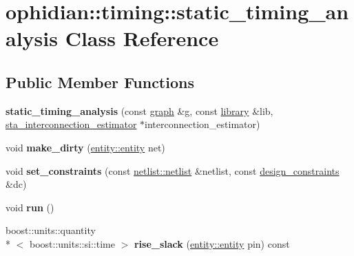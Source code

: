 \hypertarget{classophidian_1_1timing_1_1static__timing__analysis}{\section{ophidian\-:\-:timing\-:\-:static\-\_\-timing\-\_\-analysis Class Reference}
\label{classophidian_1_1timing_1_1static__timing__analysis}
}
\subsection*{Public Member Functions}
\begin{DoxyCompactItemize}
\item 
\hypertarget{classophidian_1_1timing_1_1static__timing__analysis_a78b20f32e89fdaa5c07c368962891ecc}{{\bfseries static\-\_\-timing\-\_\-analysis} (const \hyperlink{classophidian_1_1timing_1_1graph}{graph} \&g, const \hyperlink{classophidian_1_1timing_1_1library}{library} \&lib, \hyperlink{classophidian_1_1timing_1_1sta__interconnection__estimator}{sta\-\_\-interconnection\-\_\-estimator} $\ast$interconnection\-\_\-estimator)}\label{classophidian_1_1timing_1_1static__timing__analysis_a78b20f32e89fdaa5c07c368962891ecc}

\item 
\hypertarget{classophidian_1_1timing_1_1static__timing__analysis_a79be31aec074017707a897401501ce16}{void {\bfseries make\-\_\-dirty} (\hyperlink{classophidian_1_1entity_1_1entity}{entity\-::entity} net)}\label{classophidian_1_1timing_1_1static__timing__analysis_a79be31aec074017707a897401501ce16}

\item 
\hypertarget{classophidian_1_1timing_1_1static__timing__analysis_a39f48b6359c5147a2d47af9d59dc3ef3}{void {\bfseries set\-\_\-constraints} (const \hyperlink{classophidian_1_1netlist_1_1netlist}{netlist\-::netlist} \&netlist, const \hyperlink{structophidian_1_1timing_1_1design__constraints}{design\-\_\-constraints} \&dc)}\label{classophidian_1_1timing_1_1static__timing__analysis_a39f48b6359c5147a2d47af9d59dc3ef3}

\item 
\hypertarget{classophidian_1_1timing_1_1static__timing__analysis_a92b02756ab118f0d12e935bae4d63e58}{void {\bfseries run} ()}\label{classophidian_1_1timing_1_1static__timing__analysis_a92b02756ab118f0d12e935bae4d63e58}

\item 
\hypertarget{classophidian_1_1timing_1_1static__timing__analysis_af2f3b64e15f77f8732fc73ccf496a8a9}{boost\-::units\-::quantity\\*
$<$ boost\-::units\-::si\-::time $>$ {\bfseries rise\-\_\-slack} (\hyperlink{classophidian_1_1entity_1_1entity}{entity\-::entity} pin) const }\label{classophidian_1_1timing_1_1static__timing__analysis_af2f3b64e15f77f8732fc73ccf496a8a9}


\end{DoxyCompactItemize}
